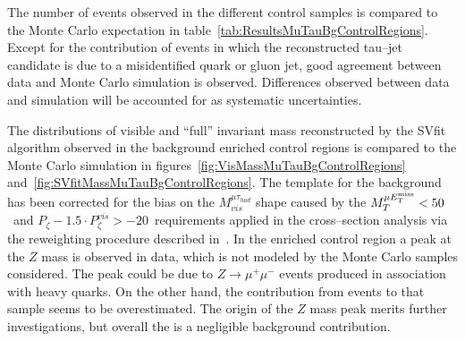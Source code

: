 The number of events observed in the different control samples is compared to
the Monte Carlo expectation in table~\ref{tab:ResultsMuTauBgControlRegions}.
Except for the contribution of \ZMM events in which the
reconstructed tau--jet candidate is due to a misidentified quark or gluon jet,
good agreement between data and Monte Carlo simulation is observed.  Differences
observed between data and simulation will be accounted for as systematic
uncertainties.

The distributions of visible and ``full'' \TT invariant mass reconstructed by
the SVfit algorithm observed in the background enriched control regions is
compared to the Monte Carlo simulation in
figures~\ref{fig:VisMassMuTauBgControlRegions}
and~\ref{fig:SVfitMassMuTauBgControlRegions}.  The template for the \WpJets
background has been corrected for the bias on the $M_{vis}^{\mu \tau_{had}}$
shape caused by the $M_{T}^{\mu E_{\mathrm{T}}^{\text{miss}}} < 50$~\GeV and $P_{\zeta} - 1.5 \cdot
P_{\zeta}^{vis} > -20$~\GeV requirements applied in the cross--section analysis
via the reweighting procedure described in~\cite{CMS_AN_2010-088}.  In the
\ttbarpJets enriched control region a peak at the $Z$ mass is observed in data,
which is not modeled by the Monte Carlo samples considered.  The peak could be
due to $Z \to \mu^{+} \mu^{-}$ events produced in association with heavy quarks.
On the other hand, the contribution from \ttbarpJets events to that sample seems
to be overestimated.  The origin of the $Z$ mass peak merits further
investigations, but overall the \ttbarpJets is a negligible background
contribution.

